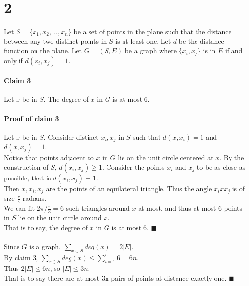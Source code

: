 \documentclass[letterpaper,12pt,oneside,onecolumn]{report}
\begin{document}
\section*{2}
\paragraph{}
Let $S = \{x_1,x_2,\ldots,x_n\}$ be a set of points in the plane such that the distance between any two distinct points in $S$ is at least one. Let $d$ be the distance function on the plane. Let $G=(S,E)$ be a graph where $\{x_i,x_j\}$ is in $E$ if and only if $d(x_i,x_j) = 1$.\\
\paragraph{Claim 3}
Let $x$ be in $S$. The degree of $x$ in $G$ is at most $6$.
\paragraph{Proof of claim 3}
Let $x$ be in $S$. Consider distinct $x_i, x_j$ in $S$ such that $d(x,x_i) = 1$ and $d(x,x_j)=1$.\\
Notice that points adjacent to $x$ in $G$ lie on the unit circle centered at $x$.
By the construction of $S$, $d(x_i,x_j) \geq 1$. Consider the points $x_i$ and $x_j$ to be as close as possible, that is $d(x_i,x_j) = 1$.\\
Then $x,x_i,x_j$ are the points of an equilateral triangle. Thus the angle $x_ixx_j$ is of size $\frac{\pi}{3}$ radians.\\
We can fit $2\pi / \frac{\pi}{3} = 6$ such triangles around $x$ at most, and thus at most $6$ points in $S$ lie on the unit circle around $x$.\\
That is to say, the degree of $x$ in $G$ is at most $6$. $\blacksquare$
\paragraph{}
Since $G$ is a graph, $\sum_{x \in S} deg(x) = 2|E|$.\\
By claim 3, $\sum_{x \in S} deg(x) \leq \sum_{i=1}^n 6 = 6n$.\\
Thus $2|E| \leq 6n$, so $|E| \leq 3n$.\\
That is to say there are at most 3n pairs of points at distance exactly one. $\blacksquare$
\end{document}

